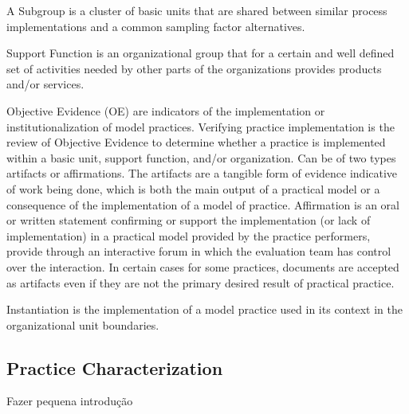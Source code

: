 A Subgroup is a cluster of basic units that are shared between similar process implementations and a common sampling factor alternatives.

Support Function is an organizational group that for a certain and well defined set of activities needed by other parts of the organizations provides products and/or services.


Objective Evidence (OE) are indicators of the implementation or institutionalization of model practices. Verifying practice implementation is the review of Objective Evidence to determine whether a practice is implemented within a basic unit, support function, and/or organization. Can be of two types artifacts or affirmations.
The artifacts are a tangible form of evidence indicative of work being done, which is both the main output of a practical model or a consequence of the implementation of a model of practice.
Affirmation is an oral or written statement confirming or support the implementation (or lack of implementation) in a practical model
provided by the practice performers, provide through an interactive forum in which the evaluation team has control over the
interaction.
In certain cases for some practices, documents are accepted as artifacts even if they are not the primary desired result of practical practice.

Instantiation is the implementation of a model practice used in its context in the organizational unit boundaries.

\subsection{Practice Characterization}
Fazer pequena introdução


